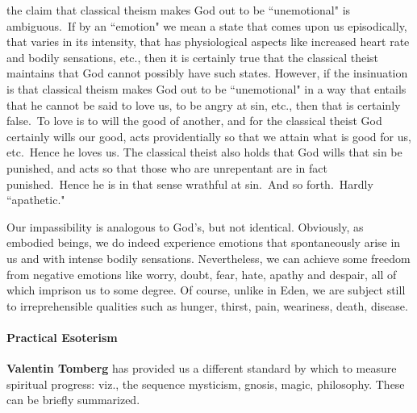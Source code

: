 \begin{quotex}
the claim that classical theism makes God out to be ``unemotional" is ambiguous. If by an ``emotion" we mean a state that comes upon us episodically, that varies in its intensity, that has physiological aspects like increased heart rate and bodily sensations, etc., then it is certainly true that the classical theist maintains that God cannot possibly have such states. However, if the insinuation is that classical theism makes God out to be ``unemotional" in a way that entails that he cannot be said to love us, to be angry at sin, etc., then that is certainly false. To love is to will the good of another, and for the classical theist God certainly wills our good, acts providentially so that we attain what is good for us, etc. Hence he loves us. The classical theist also holds that God wills that sin be punished, and acts so that those who are unrepentant are in fact punished. Hence he is in that sense wrathful at sin. And so forth. Hardly ``apathetic." 

\end{quotex}
Our impassibility is analogous to God's, but not identical. Obviously, as embodied beings, we do indeed experience emotions that spontaneously arise in us and with intense bodily sensations. Nevertheless, we can achieve some freedom from negative emotions like worry, doubt, fear, hate, apathy and despair, all of which imprison us to some degree. Of course, unlike in Eden, we are subject still to irreprehensible qualities such as hunger, thirst, pain, weariness, death, disease.

\paragraph{Practical Esoterism}
\textbf{Valentin Tomberg} has provided us a different standard by which to measure spiritual progress: viz., the sequence mysticism, gnosis, magic, philosophy. These can be briefly summarized.

